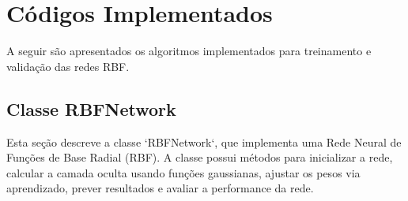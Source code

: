 \chapter{Códigos Implementados}

A seguir são apresentados os algoritmos implementados para treinamento e validação das redes RBF.

\section{Classe RBFNetwork}

Esta seção descreve a classe `RBFNetwork`, que implementa uma Rede Neural de Funções de Base Radial (RBF). A classe possui métodos para inicializar a rede, calcular a camada oculta usando funções gaussianas, ajustar os pesos via aprendizado, prever resultados e avaliar a performance da rede.

